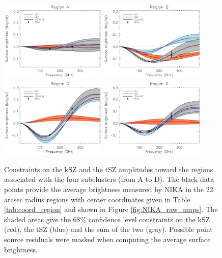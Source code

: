 \documentclass[twocolumn,traditabstract]{aa}
\begin{document}
\begin{figure}[h]
\centering
\includegraphics[width=0.45\textwidth]{Figure/SZ_spectrum_region_A22.pdf}
\includegraphics[width=0.45\textwidth]{Figure/SZ_spectrum_region_B22.pdf}
\includegraphics[width=0.45\textwidth]{Figure/SZ_spectrum_region_C22.pdf}
\includegraphics[width=0.45\textwidth]{Figure/SZ_spectrum_region_D22.pdf}
\caption{\footnotesize{Constraints on the kSZ and the tSZ amplitudes toward the regions associated with the four subclusters (from A to D). The black data points provide the average brightness measured by NIKA in the 22 arcsec radius regions with center coordinates given in Table \ref{tab:coord_region} and shown in Figure \ref{fig:NIKA_raw_maps}. The shaded areas give the 68\% confidence level constraints on the kSZ (red), the tSZ (blue) and the sum of the two (gray). Possible point source residuals were masked when computing the average surface brightness.}}
\label{fig:spectra_in_regions}
\end{figure}
\end{document}
